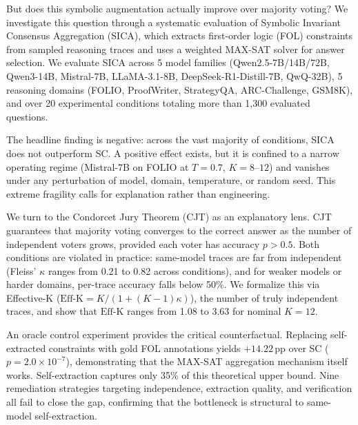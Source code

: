 \documentclass[11pt,a4paper]{article}
\newcommand{\effk}{\text{Eff-K}}
\begin{document}
But does this symbolic augmentation actually improve over majority voting? We investigate this question through a systematic evaluation of Symbolic Invariant Consensus Aggregation (SICA), which extracts first-order logic (FOL) constraints from sampled reasoning traces and uses a weighted MAX-SAT solver for answer selection. We evaluate SICA across 5 model families (Qwen2.5-7B/14B/72B, Qwen3-14B, Mistral-7B, LLaMA-3.1-8B, DeepSeek-R1-Distill-7B, QwQ-32B), 5 reasoning domains (FOLIO, ProofWriter, StrategyQA, ARC-Challenge, GSM8K), and over 20 experimental conditions totaling more than 1,300 evaluated questions.

The headline finding is negative: across the vast majority of conditions, SICA does not outperform SC. A positive effect exists, but it is confined to a narrow operating regime (Mistral-7B on FOLIO at $T=0.7$, $K=8$--$12$) and vanishes under any perturbation of model, domain, temperature, or random seed. This extreme fragility calls for explanation rather than engineering.

We turn to the Condorcet Jury Theorem (CJT) as an explanatory lens. CJT guarantees that majority voting converges to the correct answer as the number of independent voters grows, provided each voter has accuracy $p > 0.5$. Both conditions are violated in practice: same-model traces are far from independent (Fleiss' $\kappa$ ranges from 0.21 to 0.82 across conditions), and for weaker models or harder domains, per-trace accuracy falls below 50\%. We formalize this via Effective-K ($\effk = K/(1+(K-1)\kappa)$), the number of truly independent traces, and show that $\effk$ ranges from 1.08 to 3.63 for nominal $K=12$.

An oracle control experiment provides the critical counterfactual. Replacing self-extracted constraints with gold FOL annotations yields $+14.22$\,pp over SC ($p = 2.0 \times 10^{-7}$), demonstrating that the MAX-SAT aggregation mechanism itself works. Self-extraction captures only 35\% of this theoretical upper bound. Nine remediation strategies targeting independence, extraction quality, and verification all fail to close the gap, confirming that the bottleneck is structural to same-model self-extraction.
\end{document}
